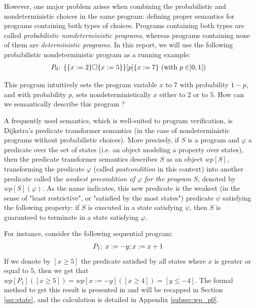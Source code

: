 \documentclass[a4paper,10pt]{llncs}
\begin{document}
However, one major problem arises when combining the probabilistic and nondeterministic choices in the same program: defining proper semantics for programs containing both types of choices. Programs containing both types are called \emph{probabilistic nondeterministic programs}, whereas programs containing none of them are \emph{deterministic programs}. In this report, we will use the following probabilistic nondeterministic program as a running example:
\begin{align*}
 P_0\textnormal{: } \{ \{x := 2\} \square \{x := 5\} \} [p] \{ x := 7 \} \textnormal{              (with } p \in ]0,1[\textnormal{)}
\end{align*}

This program intuitively sets the program variable $x$ to $7$ with probability $1-p$, and with probability $p$, sets nondeterministically $x$ either to $2$ or to $5$. How can we semantically describe this program ?\bigskip



A frequently used semantics, which is well-suited to program verification, is Dijkstra's predicate transformer semantics \cite{Dijkstra76} (in the case of nondeterministic programs without probabilistic choices). More precisely, if $S$ is a program and $\varphi$ a predicate over the set of states (i.e. an object modeling a property over states), then the predicate transformer semantics describes $S$ as an object $wp[S]$, transforming the predicate $\varphi$ (called \emph{postcondition} in this context) into another predicate called the \emph{weakest precondition of $\varphi$ for the program $S$}, denoted by $wp[S](\varphi)$. As the name indicates, this new predicate is the weakest (in the sense of "least restrictive", or "satisfied by the most states") predicate $\psi$ satisfying the following property: if $S$ is executed in a state satisfying $\psi$, then $S$ is guaranteed to terminate in a state satisfying $\varphi$.\newline


For instance, consider the following sequential program:
\begin{align*}
 P_1\textnormal{: } x := -y ; x := x+1
\end{align*}
If we denote by $[x \geq 5]$ the predicate satisfied by all states where $x$ is greater or equal to $5$, then we get that $wp[P_1]([x \geq 5]) = wp[x := -y]([x \geq 4]) = [y \leq -4]$. The formal method to get this result is presented in \cite{Dijkstra76} and will be recapped in Section \ref{sec:state}, and the calculation is detailed in Appendix \ref{subsec:wp_p0}.\bigskip
\end{document}
